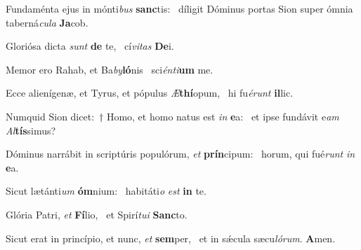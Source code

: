 \item Fundaménta ejus in mónti\textit{bus} \textbf{sanc}tis:~\psstar{} díligit Dóminus portas Sion super ómnia taberná\textit{cula} \textbf{Ja}cob.
\item Gloriósa dicta \textit{sunt} \textbf{de} te,~\psstar{} cí\textit{vitas} \textbf{De}i.
\item Memor ero Rahab, et Ba\textit{by}\textbf{ló}nis~\psstar{} sci\textit{énti}\textbf{um} me.
\item Ecce alienígenæ, et Tyrus, et pópulus \textit{Æ}\textbf{thí}opum,~\psstar{} hi fu\textit{érunt} \textbf{il}lic.
\item Numquid Sion dicet:~† Homo, et homo natus est \textit{in} \textbf{e}a:~\psstar{} et ipse fundávit e\textit{am} \textit{Al}\textbf{tís}simus?
\item Dóminus narrábit in scriptúris populórum, \textit{et} \textbf{prín}cipum:~\psstar{} horum, qui fué\textit{runt} \textit{in} \textbf{e}a.
\item Sicut lætánti\textit{um} \textbf{óm}nium:~\psstar{} habitáti\textit{o} \textit{est} \textbf{in} te.
\item Glória Patri, \textit{et} \textbf{Fí}lio,~\psstar{} et Spirí\textit{tui} \textbf{Sanc}to.
\item Sicut erat in princípio, et nunc, \textit{et} \textbf{sem}per,~\psstar{} et in sǽcula sæcu\textit{lórum}. \textbf{A}men.
